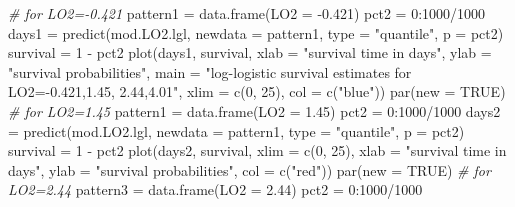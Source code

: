 \documentclass[
]{article}
\newenvironment{Shaded}{\begin{snugshade}}{\end{snugshade}}
\newcommand{\AttributeTok}[1]{\textcolor[rgb]{0.77,0.63,0.00}{#1}}
\newcommand{\CommentTok}[1]{\textcolor[rgb]{0.56,0.35,0.01}{\textit{#1}}}
\newcommand{\ConstantTok}[1]{\textcolor[rgb]{0.00,0.00,0.00}{#1}}
\newcommand{\DecValTok}[1]{\textcolor[rgb]{0.00,0.00,0.81}{#1}}
\newcommand{\FloatTok}[1]{\textcolor[rgb]{0.00,0.00,0.81}{#1}}
\newcommand{\FunctionTok}[1]{\textcolor[rgb]{0.00,0.00,0.00}{#1}}
\newcommand{\NormalTok}[1]{#1}
\newcommand{\OtherTok}[1]{\textcolor[rgb]{0.56,0.35,0.01}{#1}}
\newcommand{\SpecialCharTok}[1]{\textcolor[rgb]{0.00,0.00,0.00}{#1}}
\newcommand{\StringTok}[1]{\textcolor[rgb]{0.31,0.60,0.02}{#1}}
\begin{document}
\begin{Shaded}
\begin{Highlighting}[]
\CommentTok{\# for LO2={-}0.421}
\NormalTok{pattern1 }\OtherTok{=} \FunctionTok{data.frame}\NormalTok{(}\AttributeTok{LO2 =} \SpecialCharTok{{-}}\FloatTok{0.421}\NormalTok{)}
\NormalTok{pct2 }\OtherTok{=} \DecValTok{0}\SpecialCharTok{:}\DecValTok{1000}\SpecialCharTok{/}\DecValTok{1000}
\NormalTok{days1 }\OtherTok{=} \FunctionTok{predict}\NormalTok{(mod.LO2.lgl, }\AttributeTok{newdata =}\NormalTok{ pattern1, }\AttributeTok{type =} \StringTok{"quantile"}\NormalTok{, }\AttributeTok{p =}\NormalTok{ pct2)}
\NormalTok{survival }\OtherTok{=} \DecValTok{1} \SpecialCharTok{{-}}\NormalTok{ pct2}
\FunctionTok{plot}\NormalTok{(days1, survival, }\AttributeTok{xlab =} \StringTok{"survival time in days"}\NormalTok{, }\AttributeTok{ylab =} \StringTok{"survival}
\StringTok{     probabilities"}\NormalTok{,}
    \AttributeTok{main =} \StringTok{"log{-}logistic survival estimates for LO2={-}0.421,1.45, 2.44,4.01"}\NormalTok{, }\AttributeTok{xlim =} \FunctionTok{c}\NormalTok{(}\DecValTok{0}\NormalTok{,}
        \DecValTok{25}\NormalTok{), }\AttributeTok{col =} \FunctionTok{c}\NormalTok{(}\StringTok{"blue"}\NormalTok{))}
\FunctionTok{par}\NormalTok{(}\AttributeTok{new =} \ConstantTok{TRUE}\NormalTok{)}
\CommentTok{\# for LO2=1.45}
\NormalTok{pattern1 }\OtherTok{=} \FunctionTok{data.frame}\NormalTok{(}\AttributeTok{LO2 =} \FloatTok{1.45}\NormalTok{)}
\NormalTok{pct2 }\OtherTok{=} \DecValTok{0}\SpecialCharTok{:}\DecValTok{1000}\SpecialCharTok{/}\DecValTok{1000}
\NormalTok{days2 }\OtherTok{=} \FunctionTok{predict}\NormalTok{(mod.LO2.lgl, }\AttributeTok{newdata =}\NormalTok{ pattern1, }\AttributeTok{type =} \StringTok{"quantile"}\NormalTok{, }\AttributeTok{p =}\NormalTok{ pct2)}
\NormalTok{survival }\OtherTok{=} \DecValTok{1} \SpecialCharTok{{-}}\NormalTok{ pct2}
\FunctionTok{plot}\NormalTok{(days2, survival, }\AttributeTok{xlim =} \FunctionTok{c}\NormalTok{(}\DecValTok{0}\NormalTok{, }\DecValTok{25}\NormalTok{), }\AttributeTok{xlab =} \StringTok{"survival time in days"}\NormalTok{, }\AttributeTok{ylab =} \StringTok{"survival probabilities"}\NormalTok{,}
    \AttributeTok{col =} \FunctionTok{c}\NormalTok{(}\StringTok{"red"}\NormalTok{))}
\FunctionTok{par}\NormalTok{(}\AttributeTok{new =} \ConstantTok{TRUE}\NormalTok{)}
\CommentTok{\# for LO2=2.44}
\NormalTok{pattern3 }\OtherTok{=} \FunctionTok{data.frame}\NormalTok{(}\AttributeTok{LO2 =} \FloatTok{2.44}\NormalTok{)}
\NormalTok{pct2 }\OtherTok{=} \DecValTok{0}\SpecialCharTok{:}\DecValTok{1000}\SpecialCharTok{/}\DecValTok{1000}

\end{Highlighting}
\end{Shaded}
\end{document}
